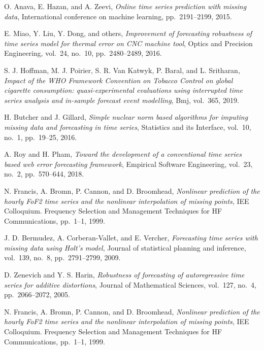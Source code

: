\begin{enumerate}[label={[S\arabic*]}]
    \item %
    O. Anava, E. Hazan, and A. Zeevi, \textit{Online time series prediction with missing data}, International conference on machine learning, pp.~2191–2199, 2015.
    \item %
    E. Miao, Y. Liu, Y. Dong, and others, \textit{Improvement of forecasting robustness of time series model for thermal error on CNC machine tool}, Optics and Precision Engineering, vol.~24, no.~10, pp.~2480–2489, 2016.
    \item %
    S. J. Hoffman, M. J. Poirier, S. R. Van Katwyk, P. Baral, and L. Sritharan, \textit{Impact of the WHO Framework Convention on Tobacco Control on global cigarette consumption: quasi-experimental evaluations using interrupted time series analysis and in-sample forecast event modelling}, Bmj, vol.~365, 2019.
    \item %
    H. Butcher and J. Gillard, \textit{Simple nuclear norm based algorithms for imputing missing data and forecasting in time series}, Statistics and its Interface, vol.~10, no.~1, pp.~19–25, 2016.
    \item %
    A. Roy and H. Pham, \textit{Toward the development of a conventional time series based web error forecasting framework}, Empirical Software Engineering, vol.~23, no.~2, pp.~570–644, 2018.
    \item %
    N. Francis, A. Bromn, P. Cannon, and D. Broomhead, \textit{Nonlinear prediction of the hourly FoF2 time series and the nonlinear interpolation of missing points}, IEE Colloquium. Frequency Selection and Management Techniques for HF Communications, pp.~1–1, 1999.
    \item %
    J. D. Bermudez, A. Corberan-Vallet, and E. Vercher, \textit{Forecasting time series with missing data using Holt's model}, Journal of statistical planning and inference, vol.~139, no.~8, pp.~2791–2799, 2009.
    \item %
    D. Zenevich and Y. S. Harin, \textit{Robustness of forecasting of autoregressive time series for additive distortions}, Journal of Mathematical Sciences, vol.~127, no.~4, pp.~2066–2072, 2005.
    \item %
    N. Francis, A. Bromn, P. Cannon, and D. Broomhead, \textit{Nonlinear prediction of the hourly FoF2 time series and the nonlinear interpolation of missing points}, IEE Colloquium. Frequency Selection and Management Techniques for HF Communications, pp.~1–1, 1999.
    \item %

\end{enumerate}
